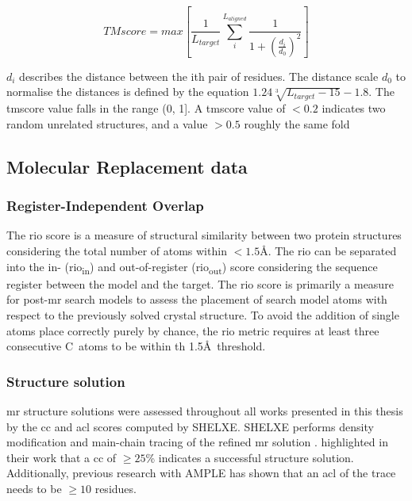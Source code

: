 \begin{equation}
    TMscore=max\left[\frac{1}{L_{target}}\sum_{i}^{L_{aligned}}{\frac{1}{1+\left(\frac{d_i}{d_0}\right)^2}}\right]
    \label{eq:methods_tmscore}
\end{equation}

$d_i$ describes the distance between the ith pair of residues. The distance scale $d_0$ to normalise the distances is defined by the equation $1.24\sqrt[3]{L_{target}-15}-1.8$. The \gls{tmscore} value falls in the range (0, 1]. A \gls{tmscore} value of $<0.2$ indicates two random unrelated structures, and a value $>0.5$ roughly the same fold \cite{Xu2010-kr}

\subsection{Molecular Replacement data}
\subsubsection{Register-Independent Overlap} \label{sec:methods_rio}
The \gls{rio} score \cite{Thomas2015-wu} is a measure of structural similarity between two protein structures considering the total number of atoms within $<1.5$\AA. The \gls{rio} can be separated into the in- (\gls{rio}\textsubscript{in}) and out-of-register (\gls{rio}\textsubscript{out}) score considering the sequence register between the model and the target. The \gls{rio} score is primarily a measure for post-\gls{mr} search models to assess the placement of search model atoms with respect to the previously solved crystal structure. To avoid the addition of single atoms place correctly purely by chance, the \gls{rio} metric requires at least three consecutive C\textalpha\ atoms to be within th 1.5\AA\ threshold.

\subsubsection{Structure solution} \label{sec:methods_mr_success}
\gls{mr} structure solutions were assessed throughout all works presented in this thesis by the \gls{cc} \cite{Fujinaga1987-vh} and \gls{acl} scores computed by SHELXE. SHELXE performs density modification and main-chain tracing of the refined \gls{mr} solution \cite{Thorn2013-le}. \textcite{Thorn2013-le} highlighted in their work that a \gls{cc} of $\geq25$\% indicates a successful structure solution. Additionally, previous research with AMPLE \cite{Thomas2015-wu} has shown that an \gls{acl} of the trace needs to be $\geq10$ residues.

